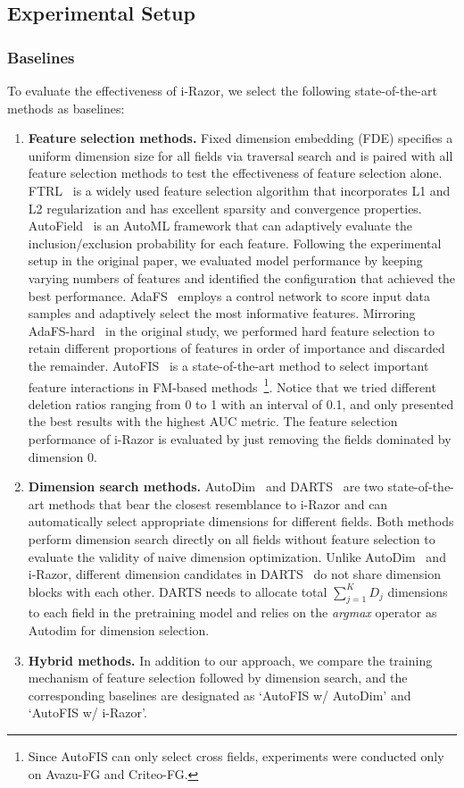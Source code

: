 \documentclass[10pt,journal,compsoc]{IEEEtran}
\begin{document}
\subsection{Experimental Setup}
\subsubsection{Baselines}
To evaluate the effectiveness of i-Razor, we select the following state-of-the-art methods as baselines:
\begin{enumerate}
\item \textbf{Feature selection methods.}
Fixed dimension embedding (FDE) specifies a uniform dimension size for all fields via traversal search and is paired with all feature selection methods to test the effectiveness of feature selection alone. 
FTRL~\cite{mcmahan2013ad} is a widely used feature selection algorithm that incorporates L1 and L2 regularization and has excellent sparsity and convergence properties.
  {AutoField~\cite{wang2022autofield} is an AutoML framework that can adaptively evaluate the inclusion/exclusion probability for each feature. Following the experimental setup in the original paper, we evaluated model performance by keeping varying numbers of features and identified the configuration that achieved the best performance. }
  {AdaFS~\cite{lin2022adafs} employs a control network to score input data samples and adaptively select the most informative features. Mirroring AdaFS-hard~\cite{lin2022adafs} in the original study, we performed hard feature selection to retain different proportions of features in order of importance and discarded the remainder.}
AutoFIS~\cite{liu2020autofis} is a state-of-the-art method to select important feature interactions in FM-based methods~\footnote{Since AutoFIS can only select cross fields, experiments were conducted only on Avazu-FG and Criteo-FG.}. Notice that we tried different deletion ratios ranging from 0 to 1 with an interval of 0.1,  and only presented the best results with the highest AUC metric.
The feature selection performance of i-Razor is evaluated by just removing the fields dominated by dimension 0.
\item \textbf{Dimension search methods.} AutoDim~\cite{zhao2020memory} and DARTS~\cite{liu2018darts} are two state-of-the-art methods that bear the closest resemblance to i-Razor and can automatically select appropriate dimensions for different fields. Both methods perform dimension search directly on all fields without feature selection to evaluate the validity of naive dimension optimization. Unlike AutoDim~\cite{zhao2020memory} and i-Razor, different dimension candidates in DARTS~\cite{liu2018darts} do not share dimension blocks with each other. DARTS needs to allocate total $\sum_{j=1}^K D_j$ dimensions to each field in the pretraining model and relies on the \emph{argmax} operator as Autodim for dimension selection.
\item \textbf{Hybrid methods.} In addition to our approach, we compare the training mechanism of feature selection followed by dimension search, and the corresponding baselines are designated as `AutoFIS w/ AutoDim' and `AutoFIS w/ i-Razor'.
\end{enumerate}
\end{document}
